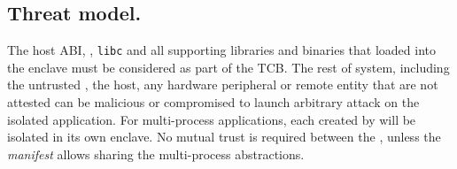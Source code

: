 %
%
%
%
%
%
%

\subsection{Threat model.}
\label{sec:gsgx:overview:threat}

The host ABI, \libos{}, {\tt libc} and all supporting libraries and binaries
that loaded into the enclave
must be considered as part of the TCB.
The rest of system, including the untrusted \pal{}, the host, any hardware peripheral or remote entity that are not attested
can be malicious or compromised
to launch arbitrary attack on the isolated application.
For multi-process applications, each \picoproc{} created by \sysname{}
will be isolated in its own enclave.
No mutual trust is required between the \picoprocs{},
unless the {\em manifest}
allows sharing the multi-process abstractions.

